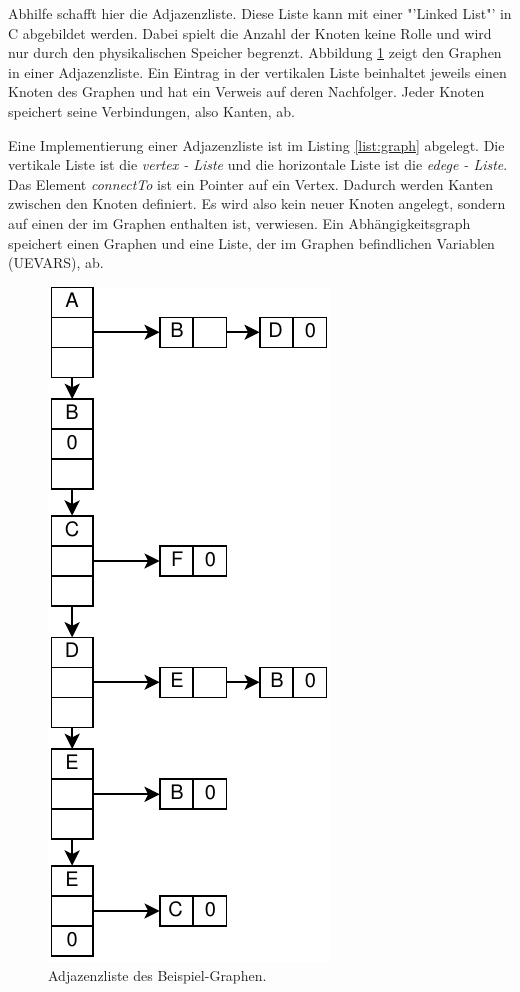 Abhilfe schafft hier die Adjazenzliste. Diese Liste kann mit einer "'Linked List"' in C abgebildet werden. Dabei spielt die Anzahl der Knoten keine Rolle und wird nur durch den physikalischen Speicher begrenzt. Abbildung \ref{fig:adjacencelist} zeigt den Graphen in einer Adjazenzliste. Ein Eintrag in der vertikalen Liste beinhaltet jeweils einen Knoten des Graphen und hat ein Verweis auf deren Nachfolger. Jeder Knoten speichert seine Verbindungen, also Kanten, ab. 

Eine Implementierung einer Adjazenzliste ist im Listing \ref{list:graph} abgelegt. Die vertikale Liste ist die \textit{vertex - Liste} und die horizontale Liste ist die \textit{edege - Liste}. Das Element \textit{connectTo} ist ein Pointer auf ein Vertex. Dadurch werden Kanten zwischen den Knoten definiert. Es wird also kein neuer Knoten angelegt, sondern auf einen der im Graphen enthalten ist, verwiesen. Ein Abhängigkeitsgraph speichert einen Graphen und eine Liste, der im Graphen befindlichen Variablen (UEVARS), ab.
\begin{figure}[h]
	\centering
	\includegraphics[scale=0.8]{images/adjacencelist.pdf} 
	\caption{Adjazenzliste des Beispiel-Graphen.}
	\label{fig:adjacencelist}
\end{figure}

